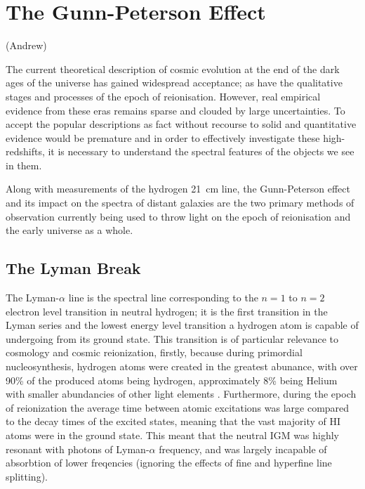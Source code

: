 
\section{The Gunn-Peterson Effect} %
\label{sec:the_gunn_peterson_effect}
(Andrew)

	The current theoretical description of cosmic evolution at the end of the dark ages of the universe has gained widespread acceptance; as have the qualitative stages and processes of the epoch of reionisation. However, real empirical evidence from these eras remains sparse and clouded by large uncertainties. To accept the popular descriptions as fact without recourse to solid and quantitative evidence would be premature and in order to effectively investigate these high-redshifts, it is necessary to understand the spectral features of the objects we see in them.

	Along with measurements of the hydrogen \SI{21}{\centi\metre} line, the Gunn-Peterson effect and its impact on the spectra of distant galaxies are the two primary methods of observation currently being used to throw light on the epoch of reionisation and the early universe as a whole.

	\subsection{The Lyman Break} %
	\label{sub:the_lyman_break}
		The Lyman-$\alpha$ line is the spectral line corresponding to the $n=1$ to $n=2$ electron level transition in neutral hydrogen; it is the first transition in the Lyman series and the lowest energy level transition a hydrogen atom is capable of undergoing from its ground state. This transition is of particular relevance to cosmology and cosmic reionization, firstly, because during primordial nucleosynthesis, hydrogen atoms were created in the greatest abunance, with over 90\% of the produced atoms being hydrogen, approximately 8\% being Helium with smaller abundancies of other light elements \cite{BBNabundance}. Furthermore, during the epoch of reionization the average time between atomic excitations was large compared to the decay times of the excited states, meaning that the vast majority of HI atoms were in the ground state. This meant that the neutral IGM was highly resonant with photons of Lyman-$\alpha$ frequency, and was largely incapable of absorbtion of lower freqencies (ignoring the effects of fine and hyperfine line splitting).

